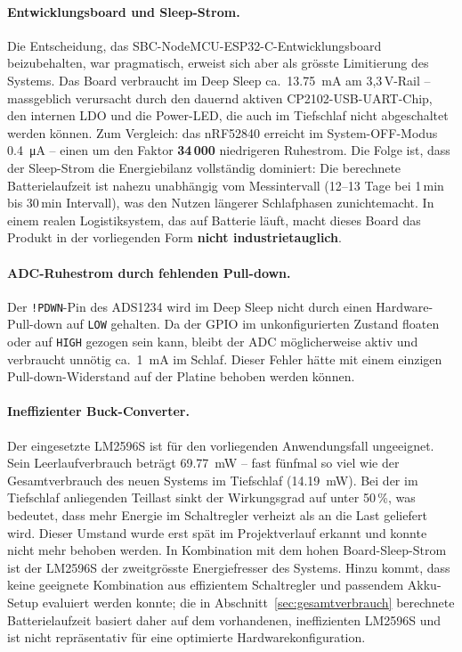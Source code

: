 \documentclass[12pt,a4paper]{article}
\begin{document}
	\paragraph{Entwicklungsboard und Sleep-Strom.}
	Die Entscheidung, das SBC-NodeMCU-ESP32-C-Entwicklungsboard beizubehalten, war pragmatisch, erweist sich aber als grösste Limitierung des Systems.
	Das Board verbraucht im Deep Sleep ca.\ \SI{13.75}{\milli\ampere} am 3{,}3\,V-Rail -- massgeblich verursacht durch den dauernd aktiven CP2102-USB-UART-Chip, den internen LDO und die Power-LED, die auch im Tiefschlaf nicht abgeschaltet werden können.
	Zum Vergleich: das nRF52840 erreicht im System-OFF-Modus \SI{0.4}{\micro\ampere} -- einen um den Faktor \textbf{34\,000} niedrigeren Ruhestrom.
	Die Folge ist, dass der Sleep-Strom die Energiebilanz vollständig dominiert: Die berechnete Batterielaufzeit ist nahezu unabhängig vom Messintervall (12--13 Tage bei 1\,min bis 30\,min Intervall), was den Nutzen längerer Schlafphasen zunichtemacht.
	In einem realen Logistiksystem, das auf Batterie läuft, macht dieses Board das Produkt in der vorliegenden Form \textbf{nicht industrietauglich}.

	\paragraph{ADC-Ruhestrom durch fehlenden Pull-down.}
	Der \texttt{!PDWN}-Pin des ADS1234 wird im Deep Sleep nicht durch einen Hardware-Pull-down auf \texttt{LOW} gehalten.
	Da der GPIO im unkonfigurierten Zustand floaten oder auf \texttt{HIGH} gezogen sein kann, bleibt der ADC möglicherweise aktiv und verbraucht unnötig ca.\ \SI{1}{\milli\ampere} im Schlaf.
	Dieser Fehler hätte mit einem einzigen Pull-down-Widerstand auf der Platine behoben werden können.

	\paragraph{Ineffizienter Buck-Converter.}
	Der eingesetzte LM2596S ist für den vorliegenden Anwendungsfall ungeeignet.
	Sein Leerlaufverbrauch beträgt \SI{69.77}{\milli\watt} -- fast fünfmal so viel wie der Gesamtverbrauch des neuen Systems im Tiefschlaf (\SI{14.19}{\milli\watt}).
	Bei der im Tiefschlaf anliegenden Teillast sinkt der Wirkungsgrad auf unter 50\,\%, was bedeutet, dass mehr Energie im Schaltregler verheizt als an die Last geliefert wird.
	Dieser Umstand wurde erst spät im Projektverlauf erkannt und konnte nicht mehr behoben werden.
	In Kombination mit dem hohen Board-Sleep-Strom ist der LM2596S der zweitgrösste Energiefresser des Systems.
	Hinzu kommt, dass keine geeignete Kombination aus effizientem Schaltregler und passendem Akku-Setup evaluiert werden konnte; die in Abschnitt~\ref{sec:gesamtverbrauch} berechnete Batterielaufzeit basiert daher auf dem vorhandenen, ineffizienten LM2596S und ist nicht repräsentativ für eine optimierte Hardwarekonfiguration.
\end{document}
